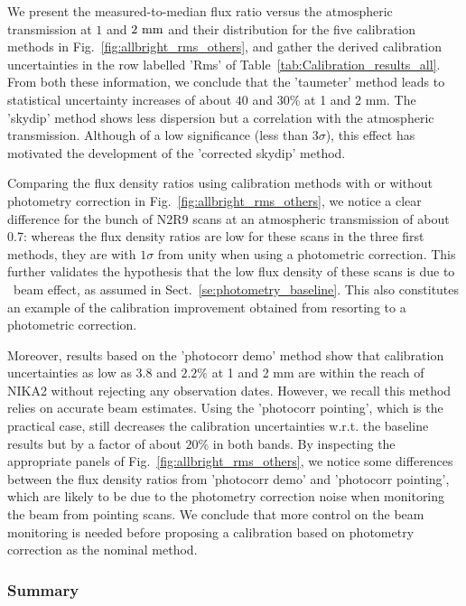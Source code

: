 We present the measured-to-median flux ratio versus the atmospheric
transmission at $1$ and $2~\rm{mm}$ and their distribution for the
five calibration methods in Fig.~\ref{fig:allbright_rms_others}, and
gather the derived calibration uncertainties in the row labelled 'Rms'
of Table~\ref{tab:Calibration_results_all}. From both these
information, we conclude that the 'taumeter' method leads to 
statistical uncertainty increases of about $40$ and $30\%$ at 1 and 2
mm. The 'skydip' method shows less dispersion but a correlation with
the atmospheric transmission. Although of a low significance (less
than $3\sigma$), this effect has motivated the development of the
'corrected skydip' method.

Comparing the flux density ratios using calibration methods with or
without photometry correction in Fig.~\ref{fig:allbright_rms_others},
we notice a clear difference for the bunch of N2R9 scans at an
atmospheric transmission of about 0.7: whereas the flux density ratios
are low for these scans in the three first methods, they are with
$1\sigma$ from unity when using a photometric correction. This further
validates the hypothesis that the low flux density of these scans is due to
\afternoon\ beam effect, as assumed in
Sect.~\ref{se:photometry_baseline}. This also constitutes an example
of the calibration improvement obtained from resorting to a
photometric correction.

Moreover, results based on the 'photocorr demo' method show that calibration
uncertainties as low as $3.8$ and $2.2\%$
at 1 and 2 mm are within the reach of NIKA2 without rejecting any
observation dates. However, we recall this method relies on 
accurate beam estimates. Using the 'photocorr pointing', which is the
practical case, still decreases the calibration uncertainties
w.r.t. the baseline results but by a factor of about $20\%$ in both
bands. By inspecting the appropriate panels of
Fig.~\ref{fig:allbright_rms_others}, we notice some differences between
the flux density ratios from 'photocorr demo' and 'photocorr
pointing', which are likely to be due to the photometry correction noise
when monitoring the beam from pointing scans. We conclude that more
control on the beam monitoring is needed before proposing a calibration
based on photometry correction as the nominal method.


\subsubsection{Summary}

